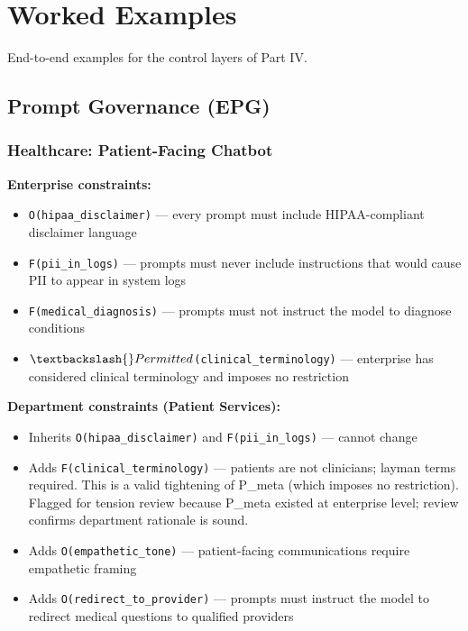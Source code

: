 \chapter{Worked Examples}
\label{ch:clad-examples}


End-to-end examples for the control layers of Part IV.

\section{Prompt Governance (EPG)}
\label{sec:clad-examples-B-1}


\subsection{Healthcare: Patient-Facing Chatbot}
\label{sec:clad-examples-B-1-1}


\textbf{Enterprise constraints:}
\begin{itemize}
  \item \texttt{O(hipaa\_\allowbreak{}disclaimer)} --- every prompt must include HIPAA-compliant disclaimer language
  \item \texttt{F(pii\_\allowbreak{}in\_\allowbreak{}logs)} --- prompts must never include instructions that would cause PII to appear in system logs
  \item \texttt{F(medical\_\allowbreak{}diagnosis)} --- prompts must not instruct the model to diagnose conditions
  \item \texttt{$\textbackslash\{\}Permitted$(clinical\_\allowbreak{}terminology)} --- enterprise has considered clinical terminology and imposes no restriction
\end{itemize}


\textbf{Department constraints (Patient Services):}
\begin{itemize}
  \item Inherits \texttt{O(hipaa\_\allowbreak{}disclaimer)} and \texttt{F(pii\_\allowbreak{}in\_\allowbreak{}logs)} --- cannot change
  \item Adds \texttt{F(clinical\_\allowbreak{}terminology)} --- patients are not clinicians; layman terms required. This is a valid tightening of P\_\allowbreak{}meta (which imposes no restriction). Flagged for tension review because P\_\allowbreak{}meta existed at enterprise level; review confirms department rationale is sound.
  \item Adds \texttt{O(empathetic\_\allowbreak{}tone)} --- patient-facing communications require empathetic framing
  \item Adds \texttt{O(redirect\_\allowbreak{}to\_\allowbreak{}provider)} --- prompts must instruct the model to redirect medical questions to qualified providers
\end{itemize}


